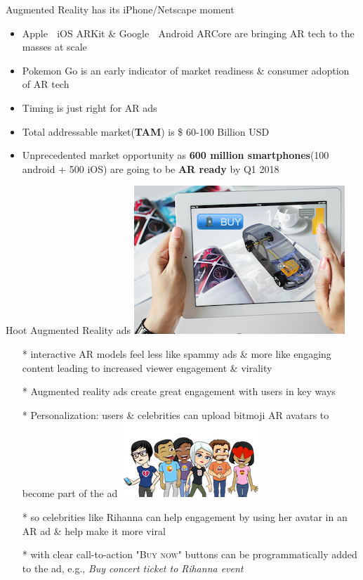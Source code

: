 \documentclass[11pt,handout]{beamer}
\begin{document}
\begin{frame}[t]{Augmented Reality has its iPhone/Netscape moment}
 \begin{itemize}[<+-| alert@+>]
	\item Apple 🍎
	 iOS ARKit \& Google 🤖 Android ARCore are bringing AR tech to the masses at scale
	\item Pokemon Go is an early indicator of market readiness \& consumer adoption of AR tech
	\item Timing is just right for AR ads
	\item Total addressable market(\textbf{TAM}) is \$ 60-100 Billion USD 
	\item Unprecedented market opportunity as \textbf{600 million smartphones}(100 android + 500 iOS)  are going to be \textbf{AR ready} by Q1 2018
\end{itemize}
\end{frame}
\begin{frame}[t]{Hoot Augmented Reality ads \includegraphics[scale=.1]{static/arad/arad5}} 
 \begin{itemize}[<+-| alert@+>]
\item[*]interactive AR models feel less like spammy ads \& more like engaging content leading to increased viewer engagement \& virality 
\item[*]Augmented reality ads create great engagement with users in key ways
\item[*]Personalization: users \& celebrities can upload bitmoji AR avatars to become part of the ad
\includegraphics[scale=.15]{static/arad/bitmoji} 
\item[*]so celebrities like Rihanna can help engagement by using her avatar in an AR ad \& help make it more viral 
\item[*]with clear call-to-action \textsc{"Buy now"} buttons can be programmatically added to the ad, e.g., \emph{ Buy concert ticket to Rihanna event}
\end{itemize}
\end{frame}
\end{document}
